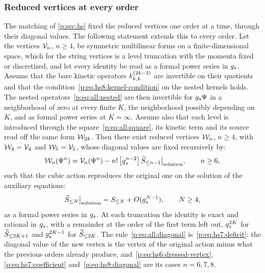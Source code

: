 \subsubsection{Reduced vertices at every order}
\label{p:sec:all:reduced-vertices}

The matching of \cref{p:sec:hs} fixed the reduced vertices one order at a time, through their diagonal values.
The following statement extends this to every order.
Let the vertices $\vertex{n}$, $n \ge 4$, be symmetric multilinear forms on a finite-dimensional space, which for the string vertices is a level truncation with the momenta fixed or discretized, and let every identity be read as a formal power series in $\gs$.
Assume that the bare kinetic operators $\kin{k}{}{2 k - 2}$ are invertible on their quotients and that the condition~\eqref{p:eq:hs8:kernel-condition} on the nested kernels holds.
The nested operators~\eqref{p:eq:all:nested} are then invertible for $\gs \Psi$ in a neighborhood of zero at every finite $K$, the neighborhood possibly depending on $K$, and as formal power series at $K = \infty$.
Assume also that each level is introduced through the square~\eqref{p:eq:all:square}, its kinetic term and its source read off the same form $\dvertex{2 k}$.
Then there exist reduced vertices $\dvertex{n}$, $n \ge 4$, with $\dvertex{4} = \vertex{4}$ and $\dvertex{5} = \vertex{5}$, whose diagonal values are fixed recursively by:
\begin{equation}
  \label{p:eq:all:diagonal}
  \dvertex{n}(\Psi^n)
    = \vertex{n}(\Psi^n) - n! \, \big[ \gs^{n - 2} \big] \, \caction[\le n - 1] \big|_{\text{solution}},
  \qquad
  n \ge 6,
\end{equation}
such that the cubic action reproduces the original one on the solution of the auxiliary equations:
\begin{equation}
  \label{p:eq:all:closure}
  \caction[\le N] \big|_{\text{solution}}
    = S_{\le N} + O(\gs^{N - 1}),
  \qquad
  N \ge 4,
\end{equation}
as a formal power series in $\gs$.
At each truncation the identity is exact and rational in $\gs$, with a remainder at the order of the first term left out, $\gs^{2 K}$ for $\caction[\le 2 K + 1]$ and $\gs^{2 K - 1}$ for $\caction[\le 2 K]$.
The rule~\eqref{p:eq:all:diagonal} is~\eqref{p:eq:hs7:deficit}: the diagonal value of the new vertex is the vertex of the original action minus what the previous orders already produce, and~\eqref{p:eq:hs6:dressed-vertex}, \eqref{p:eq:hs7:coefficient} and~\eqref{p:eq:hs8:diagonal} are its cases $n = 6, 7, 8$.

